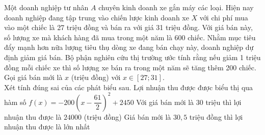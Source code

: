 \begin{ex}%
	Một doanh nghiệp tư nhân $A$ chuyên kinh doanh xe gắn máy các loại. Hiện nay doanh nghiệp đang tập trung vào chiến lược kinh doanh xe $X$ với chi phí mua vào một chiếc là 27 triệu đồng và bán ra với giá 31 triệu đồng. Với giá bán này, số lượng xe mà khách hàng đã mua trong một năm là 600 chiếc. Nhằm mục tiêu đẩy mạnh hơn nữa lượng tiêu thụ dòng xe đang bán chạy này, doanh nghiệp dự định giảm giá bán. Bộ phận nghiên cứu thị trường ước tính rằng nếu giảm 1 triệu đồng mỗi chiếc xe thì số lượng xe bán ra trong một năm sẽ tăng thêm 200 chiếc. Gọi giá bán mới là $x$ (triệu đồng) với $x \in [27;31]$. \\
	Xét tính đúng sai của các phát biểu sau.
	{\True Lợi nhuận thu được được biểu thị qua hàm số $f(x)=-200\left(x-\dfrac{61}{2}\right)^2+2450$}
	{Với giá bán mới là $30$ triệu thì lợi nhuận thu được là $24000$ (triệu đồng)}
	{\True Giá bán mới là $30,5$ triệu đồng thì lợi nhuận thu được là lớn nhất}
\end{ex}

